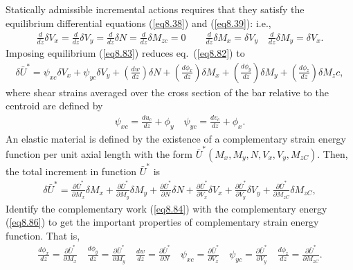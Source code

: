 \documentclass{AeroStructure-ERJohnson}
\begin{document}
\noindent Statically admissible incremental actions requires that they
satisfy the equilibrium differential equations (\ref{eq8.38}) and
(\ref{eq8.39}): i.e.,
\begin{align}\label{eq8.83}
\frac{d}{d z} \delta V_{x}=\frac{d}{d z} \delta V_{y}=\frac{d}{d
z} \delta N=\frac{d}{d z} \delta M_{z c}=0 \qquad \frac{d}{d z}
\delta M_{x}=\delta V_{y} \quad \frac{d}{d z} \delta M_{y}=\delta
V_{x}.
\end{align}
Imposing equilibrium (\ref{eq8.83}) reduces eq.~(\ref{eq8.82}) to
\begin{align}\label{eq8.84}
\delta \bar{U}^{*}=\psi_{x c} \delta V_{x}+\psi_{y c} \delta
V_{y}+\left(\frac{d w}{d z}\right) \delta N+\left(\frac{d
\phi_{x}}{d z}\right) \delta M_{x}+\left(\frac{d \phi_{y}}{d
z}\right) \delta M_{y}+\left(\frac{d \phi_{z}}{d z}\right) \delta
M_{z} c,
\end{align}
where shear strains averaged over the cross section of the bar
relative to the centroid are defined by
\begin{align}\label{eq8.85}
\psi_{x c}=\frac{d u_{c}}{d z}+\phi_{y} \quad \psi_{y c}=\frac{d
v_{c}}{d z}+\phi_{x}.
\end{align}
An elastic material is defined by the existence of a complementary
strain energy function per unit axial length with the form
$\bar{U}^{*}\left(M_{x}, M_{y}, N, V_{x}, V_{y}, M_{z C}\right)$.
Then, the total increment in function $\bar{U}^{*}$ is
\begin{align}\label{eq8.86}
\delta \bar{U}^{*}=\frac{\partial \bar{U}^{*}}{\partial M_{x}}
\delta M_{x}+\frac{\partial \bar{U}^{*}}{\partial M_{y}} \delta
M_{y}+\frac{\partial \bar{U}^{*}}{\partial N} \delta
N+\frac{\partial \bar{U}^{*}}{\partial V_{x}} \delta
V_{x}+\frac{\partial \bar{U}^{*}}{\partial V_{y}} \delta
V_{y}+\frac{\partial \bar{U}^{*}}{\partial M_{zC} } \delta M_{zC},
\end{align}
Identify the complementary work (\ref{eq8.84}) with the
complementary energy (\ref{eq8.86}) to get the important
properties of complementary strain energy function. That is,
\begin{align}\label{eq8.87}
\frac{d \phi_{x}}{d z}=\frac{\partial \bar{U}^{*}}{\partial M_{x}}
\quad \frac{d \phi_{y}}{d z}=\frac{\partial \bar{U}^{*}}{\partial
M_{y}} \quad \frac{d w}{d z}=\frac{\partial \bar{U}^{*}}{\partial
N} \quad \psi_{x c}=\frac{\partial \bar{U}^{*}}{\partial V_{x}}
\quad \psi_{y c}=\frac{\partial \bar{U}^{*}}{\partial V_{y}} \quad
\frac{d \phi_{z}}{d z}=\frac{\partial \bar{U}^{*}}{\partial M_{z
C}}.
\end{align}
\end{document}
